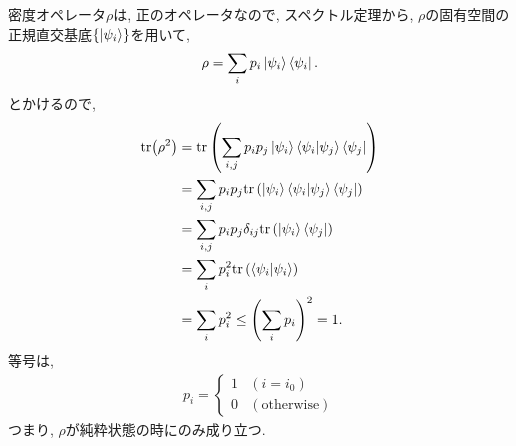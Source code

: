 \begin{ex}
    \label{ex2.71}
    密度オペレータ$\rho$は, 正のオペレータなので, スペクトル定理から, $\rho$の固有空間の正規直交基底$\{ \ket{\psi_i}\}$を用いて, 
    \begin{align*}
        \rho = \sum_i p_i \ket{\psi_i}\bra{\psi_i}.
    \end{align*}
    とかけるので,
    \begin{align*}
        \mathrm{tr}{\left(\rho^2 \right)}
         & =
        \mathrm{tr}
        \left(
        \sum_{i,j} p_i p_j \ket{\psi_i}\braket{\psi_i|\psi_j}\bra{\psi_j}
        \right)                                                  \\
         & =
        \sum_{i,j} p_i p_j
        \mathrm{tr}
        \left(
        \ket{\psi_i}\braket{\psi_i|\psi_j}\bra{\psi_j}
        \right)                                                  \\
         & =
        \sum_{i,j} p_i p_j
        \delta_{ij}
        \mathrm{tr}
        \left(
        \ket{\psi_i}\bra{\psi_j}
        \right)                                                  \\
         & =
        \sum_{i} p_i ^2
        \mathrm{tr}
        \left(
        \braket{\psi_i|{\psi_i}}
        \right)                                                  \\
         & =\sum_{i} p_i ^2 \le \left(\sum_{i} p_i\right)^2 = 1.
    \end{align*}
    等号は,
    \begin{align*}
        p_i =
        \begin{cases}
            1 & (i=i_0)              \\
            0 & (\mathrm{otherwise})
        \end{cases}
    \end{align*}
    つまり, $\rho$が純粋状態の時にのみ成り立つ.
\end{ex}

